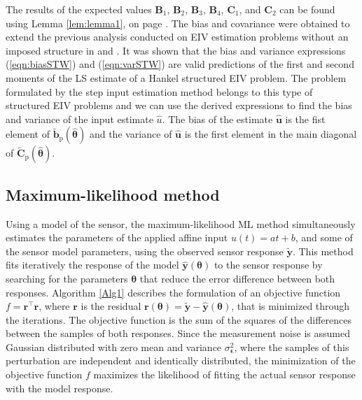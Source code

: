 The results of the expected values $\mathbf{B}_1$, $\mathbf{B}_2$, $\mathbf{B}_3$, $\mathbf{B}_4$, $\mathbf{C}_1$, and $\mathbf{C}_2$ can be found using Lemma \ref{lem:lemma1}, on page \pageref{lem:lemma1}.
The bias and covariance were obtained to extend the previous analysis conducted on EIV estimation problems without an imposed structure in \citet{Vaccaro94} and \citet{Stewart90SPT}.
It was shown that the bias and variance expressions (\ref{eqn:biasSTW}) and (\ref{eqn:varSTW}) are valid predictions of the first and second moments of the LS estimate of a Hankel structured EIV problem.
The problem formulated by the step input estimation method belongs to this type of structured EIV problems and we can use the derived expressions to find the bias and variance of the input estimate $\widehat{u}$.
The bias of the estimate $\widehat{\mathbf{u}}$ is the fist element of $\widetilde{\mathbf{b}}_{\mathrm{p}} \left( \widehat{\bm{\theta}} \right)$ and the variance of $\widehat{\mathbf{u}}$ is the first element in the main diagonal of $\widetilde{\mathbf{C}}_{\mathrm{p}} \left( \widehat{\bm{\theta}} \right)$.


\subsection{Maximum-likelihood method}


Using a model of the sensor, the maximum-likelihood ML method simultaneously estimates the parameters of the applied affine input $u(t) = at + b$, and some of the sensor model parameters, \color{blue} using the observed sensor response $\widetilde{\mathbf{y}}$\color{black}.
\color{blue} This method fits iteratively the response of the model $\widehat{\mathbf{y}}(\bm{\theta})$ to the sensor response by searching for the parameters $\bm{\theta}$ that reduce the error difference between both responses.
Algorithm \ref{Alg1} describes the formulation of an objective function $f = \mathbf{r}^\top \mathbf{r}$, where $\mathbf{r}$ is the residual $\mathbf{r}(\bm{\theta}) = \widetilde{\mathbf{y}} - \widehat{\mathbf{y}}(\bm{\theta})$, that is minimized through the iterations.
The objective function is the sum of the squares of the differences between the samples of both responses.
Since the measurement noise is assumed Gaussian distributed with zero mean and variance $\sigma_{\bm{\epsilon}}^2$, where the samples of this perturbation are independent and identically distributed, the minimization of the objective function $f$ maximizes the likelihood of fitting the actual sensor response with the model response.


